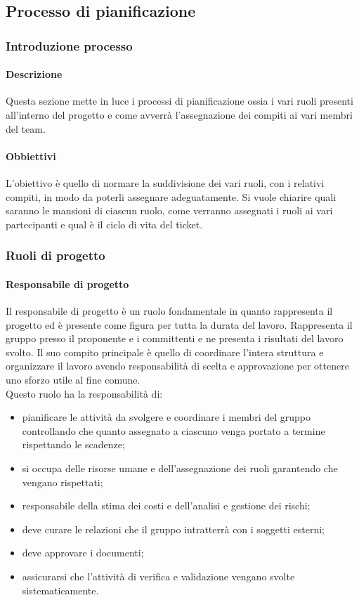     \subsection{Processo di pianificazione}
        \subsubsection{Introduzione processo}
            \paragraph{Descrizione}
                Questa sezione mette in luce i processi di pianificazione ossia i vari ruoli presenti all’interno del progetto e come avverrà l’assegnazione dei compiti ai vari membri del team. 
            \paragraph{Obbiettivi}
                L’obiettivo è quello di normare la suddivisione dei vari ruoli, con i relativi compiti, in modo da poterli assegnare adeguatamente. Si vuole chiarire quali saranno le mansioni di ciascun ruolo, come verranno assegnati i ruoli ai vari partecipanti e qual è il ciclo di vita del ticket.
        \subsubsection{Ruoli di progetto}
            \paragraph{Responsabile di progetto}
                Il responsabile di progetto è un ruolo fondamentale in quanto rappresenta il progetto ed è presente come figura per tutta la durata del lavoro. Rappresenta il gruppo presso il proponente e i committenti e ne presenta i risultati del lavoro svolto. Il suo compito principale è quello di coordinare l’intera struttura e organizzare il lavoro avendo responsabilità di scelta e approvazione per ottenere uno sforzo utile al fine comune.\\
                Questo ruolo ha la responsabilità di: \\
                \begin{itemize}
                    \item pianificare le attività da svolgere e coordinare i membri del gruppo controllando che quanto assegnato a ciascuno venga portato a termine rispettando le scadenze;
                    \item    si occupa delle risorse umane e dell’assegnazione dei ruoli garantendo che vengano rispettati;
                    \item    responsabile della stima dei costi e dell’analisi e gestione dei rischi;
                    \item    deve curare le relazioni che il gruppo intratterrà con i soggetti esterni;
                    \item deve approvare i documenti;
                    \item assicurarsi che l’attività di verifica e validazione vengano svolte sistematicamente.
                \end{itemize}
